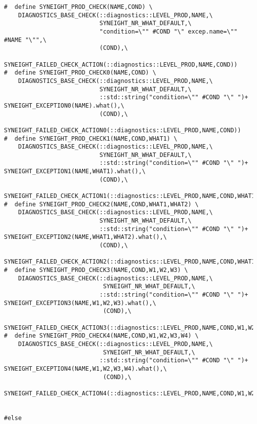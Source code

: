 \begin{verbatim}
#  define SYNEIGHT_PROD_CHECK(NAME,COND) \
    DIAGNOSTICS_BASE_CHECK(::diagnostics::LEVEL_PROD,NAME,\
                           SYNEIGHT_NR_WHAT_DEFAULT,\
                           "condition=\"" #COND "\" excep.name=\"" #NAME "\"",\
                           (COND),\
                           SYNEIGHT_FAILED_CHECK_ACTION(::diagnostics::LEVEL_PROD,NAME,COND))
#  define SYNEIGHT_PROD_CHECK0(NAME,COND) \
    DIAGNOSTICS_BASE_CHECK(::diagnostics::LEVEL_PROD,NAME,\
                           SYNEIGHT_NR_WHAT_DEFAULT,\
                           ::std::string("condition=\"" #COND "\" ")+ SYNEIGHT_EXCEPTION0(NAME).what(),\
                           (COND),\
                           SYNEIGHT_FAILED_CHECK_ACTION0(::diagnostics::LEVEL_PROD,NAME,COND))
#  define SYNEIGHT_PROD_CHECK1(NAME,COND,WHAT1) \
    DIAGNOSTICS_BASE_CHECK(::diagnostics::LEVEL_PROD,NAME,\
                           SYNEIGHT_NR_WHAT_DEFAULT,\
                           ::std::string("condition=\"" #COND "\" ")+ SYNEIGHT_EXCEPTION1(NAME,WHAT1).what(),\
                           (COND),\
                           SYNEIGHT_FAILED_CHECK_ACTION1(::diagnostics::LEVEL_PROD,NAME,COND,WHAT1))
#  define SYNEIGHT_PROD_CHECK2(NAME,COND,WHAT1,WHAT2) \
    DIAGNOSTICS_BASE_CHECK(::diagnostics::LEVEL_PROD,NAME,\
                           SYNEIGHT_NR_WHAT_DEFAULT,\
                           ::std::string("condition=\"" #COND "\" ")+ SYNEIGHT_EXCEPTION2(NAME,WHAT1,WHAT2).what(),\
                           (COND),\
                           SYNEIGHT_FAILED_CHECK_ACTION2(::diagnostics::LEVEL_PROD,NAME,COND,WHAT1,WHAT2))
#  define SYNEIGHT_PROD_CHECK3(NAME,COND,W1,W2,W3) \
    DIAGNOSTICS_BASE_CHECK(::diagnostics::LEVEL_PROD,NAME,\
                            SYNEIGHT_NR_WHAT_DEFAULT,\
                           ::std::string("condition=\"" #COND "\" ")+ SYNEIGHT_EXCEPTION3(NAME,W1,W2,W3).what(),\
                            (COND),\
                            SYNEIGHT_FAILED_CHECK_ACTION3(::diagnostics::LEVEL_PROD,NAME,COND,W1,W2,W3))
#  define SYNEIGHT_PROD_CHECK4(NAME,COND,W1,W2,W3,W4) \
    DIAGNOSTICS_BASE_CHECK(::diagnostics::LEVEL_PROD,NAME,\
                            SYNEIGHT_NR_WHAT_DEFAULT,\
                           ::std::string("condition=\"" #COND "\" ")+ SYNEIGHT_EXCEPTION4(NAME,W1,W2,W3,W4).what(),\
                            (COND),\
                            SYNEIGHT_FAILED_CHECK_ACTION4(::diagnostics::LEVEL_PROD,NAME,COND,W1,W2,W3,W4))


#else


\end{verbatim}
